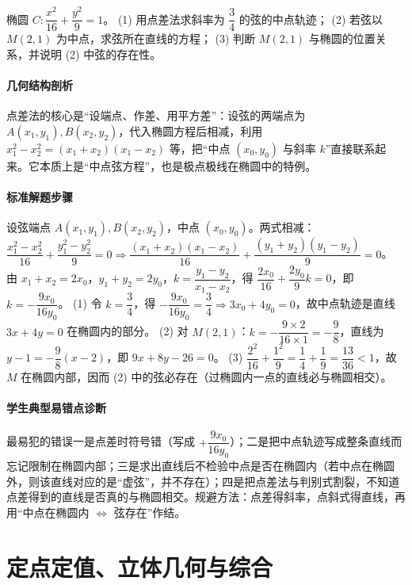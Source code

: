 \begin{problem}
椭圆 $C:\dfrac{x^2}{16}+\dfrac{y^2}{9}=1$。
(1) 用点差法求斜率为 $\dfrac34$ 的弦的中点轨迹；
(2) 若弦以 $M(2,1)$ 为中点，求弦所在直线的方程；
(3) 判断 $M(2,1)$ 与椭圆的位置关系，并说明 (2) 中弦的存在性。
\end{problem}
\begin{solution}
\paragraph{几何结构剖析}
点差法的核心是“设端点、作差、用平方差”：设弦的两端点为 $A(x_1,y_1),B(x_2,y_2)$，代入椭圆方程后相减，利用 $x_1^2-x_2^2=(x_1+x_2)(x_1-x_2)$ 等，把“中点 $(x_0,y_0)$ 与斜率 $k$”直接联系起来。它本质上是“中点弦方程”，也是极点极线在椭圆中的特例。
\paragraph{标准解题步骤}
设弦端点 $A(x_1,y_1),B(x_2,y_2)$，中点 $(x_0,y_0)$。两式相减：
$\dfrac{x_1^2-x_2^2}{16}+\dfrac{y_1^2-y_2^2}{9}=0
\Rightarrow \dfrac{(x_1+x_2)(x_1-x_2)}{16}+\dfrac{(y_1+y_2)(y_1-y_2)}{9}=0$。
由 $x_1+x_2=2x_0$，$y_1+y_2=2y_0$，$k=\dfrac{y_1-y_2}{x_1-x_2}$，得
$\dfrac{2x_0}{16}+\dfrac{2y_0}{9}k=0$，即 $k=-\dfrac{9x_0}{16y_0}$。
(1) 令 $k=\dfrac34$，得 $-\dfrac{9x_0}{16y_0}=\dfrac34\Rightarrow 3x_0+4y_0=0$，故中点轨迹是直线 $3x+4y=0$ 在椭圆内的部分。
(2) 对 $M(2,1)$：$k=-\dfrac{9\times2}{16\times1}=-\dfrac98$，直线为 $y-1=-\dfrac98(x-2)$，即 $9x+8y-26=0$。
(3) $\dfrac{2^2}{16}+\dfrac{1^2}{9}=\dfrac14+\dfrac19=\dfrac{13}{36}<1$，故 $M$ 在椭圆内部，因而 (2) 中的弦必存在（过椭圆内一点的直线必与椭圆相交）。
\paragraph{学生典型易错点诊断}
最易犯的错误一是点差时符号错（写成 $+\dfrac{9x_0}{16y_0}$）；二是把中点轨迹写成整条直线而忘记限制在椭圆内部；三是求出直线后不检验中点是否在椭圆内（若中点在椭圆外，则该直线对应的是“虚弦”，并不存在）；四是把点差法与判别式割裂，不知道点差得到的直线是否真的与椭圆相交。规避方法：点差得斜率，点斜式得直线，再用“中点在椭圆内 $\iff$ 弦存在”作结。
\end{solution}

\section{定点定值、立体几何与综合}

